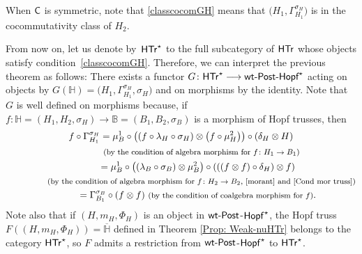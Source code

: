 \documentclass[10pt,a4paper]{amsart}
\numberwithin{equation}{section}
\begin{document}
\begin{Remark}
When $\sf{C}$ is symmetric, note that \eqref{classcocomGH} means that $\bigl(H_{1},\Gamma_{H_{1}}^{\sigma_{H}}\bigr)$ is in the cocommutativity class of $H_{2}$.
\end{Remark}
From now on, let us denote by~$\sf{HTr}^{\star}$ to the full subcategory of $\sf{HTr}$ whose objects satisfy condition~\eqref{classcocomGH}. Therefore, we can interpret the previous theorem as follows: There exists a functor
$G\colon \sf{HTr}^{\star}\longrightarrow \textnormal{{\sf wt}-{\sf Post}-{\sf Hopf}}^{\star}$
acting on objects by $G(\mathbb{H})=\bigl(H_{1},\Gamma_{H_{1}}^{\sigma_{H}},\sigma_{H}\bigr)$ and on morphisms by the identity. Note that $G$ is well defined on morphisms because, if $f\colon \mathbb{H}=(H_{1},H_{2},\sigma_{H})\rightarrow \mathbb{B}=(B_{1},B_{2},\sigma_{B})$ is a morphism of Hopf trusses, then
\begin{gather}
 f\circ\Gamma_{H_{1}}^{\sigma_{H}} = \mu_{B}^{1}\circ\bigl((f\circ\lambda_{H}\circ\sigma_{H})\otimes\bigl(f\circ \mu_{H}^{2}\bigr)\bigr)\circ(\delta_{H}\otimes H)\nonumber\\
\hphantom{f\circ\Gamma_{H_{1}}^{\sigma_{H}}=}{}
\text{\footnotesize\textnormal{(by the condition of algebra morphism for $f\colon H_{1}\rightarrow B_{1}$)}}\nonumber\\ \hphantom{f\circ\Gamma_{H_{1}}^{\sigma_{H}}}{}
= \mu_{B}^{1}\circ\bigl((\lambda_{B}\circ\sigma_{B})\otimes\mu_{B}^{2}\bigr)\circ(((f\otimes f)\circ\delta_{H})\otimes f)\nonumber\\ \hphantom{f\circ\Gamma_{H_{1}}^{\sigma_{H}}=}{}
 \text{\footnotesize\textnormal{(by the condition of algebra morphism for $f\colon H_{2}\rightarrow B_{2}$, \eqref{morant} and \eqref{Cond mor truss})}}\nonumber\\ \hphantom{f\circ\Gamma_{H_{1}}^{\sigma_{H}}}{}
= \Gamma_{B_{1}}^{\sigma_{B}}\circ(f\otimes f)\ \text{\footnotesize\textnormal{(by the condition of coalgebra morphism for $f$)}}.\label{gammatrussf}
\end{gather}
Note also that if $(H,m_{H},\Phi_{H})$ is an object in ${\sf wt}\textnormal{-}{\sf Post}$-${\sf Hopf}^{\star}$, the Hopf truss $F((H,m_{H},\Phi_{H}))=\overline{\mathbb{H}}$ defined in Theorem \ref{Prop: Weak-nuHTr} belongs to the category $\sf{HTr}^{\star}$, so $F$ admits a restriction from ${\sf wt}\textnormal{-}{\sf Post}$-${\sf Hopf}^{\star}$ to $\sf{HTr}^{\star}$.
\end{document}
